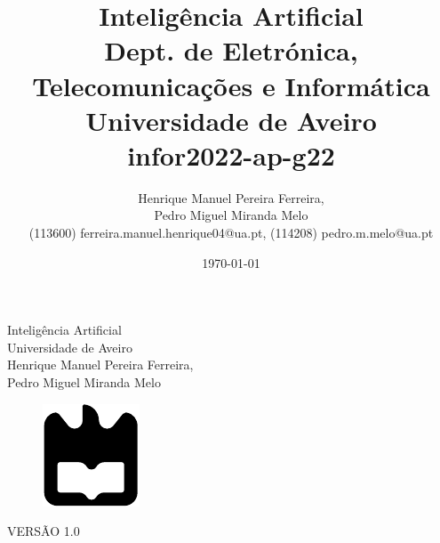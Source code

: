 \documentclass{report}
\begin{document}
%
\def\titulo{Inteligência Artificial}
\def\data{DATA}
\def\autores{Henrique Manuel Pereira Ferreira,\\ Pedro Miguel Miranda Melo}
\def\autorescontactos{(113600) ferreira.manuel.henrique04@ua.pt, (114208) pedro.m.melo@ua.pt}
\def\versao{VERSÃO 1.0}
\def\departamento{Dept. de Eletrónica, Telecomunicações e Informática}
\def\empresa{Universidade de Aveiro}
\def\logotipo{ua.pdf}
\def\repositorio{infor2022-ap-g22}
%
%
\begin{titlepage}

\begin{center}
%
\vspace*{50mm}
%
{\Huge \titulo}\\ 
%
\vspace{10mm}
%
{\Large \empresa}\\
%
\vspace{10mm}
%
{\LARGE \autores}\\ 
%
\vspace{30mm}
%
\begin{figure}[h]
\center
\includegraphics{Imagens/ua.pdf}
\end{figure}
%
\vspace{30mm}
\end{center}
%
\begin{flushright}
\versao
\end{flushright}
\end{titlepage}

\title{%
{\Huge\textbf{\titulo}}\\
{\Large \departamento\\ \empresa\\ \repositorio}
}
%
\author{%
    \autores \\
    \autorescontactos
}
%
\date{\today}
%
\maketitle

\end{document}
